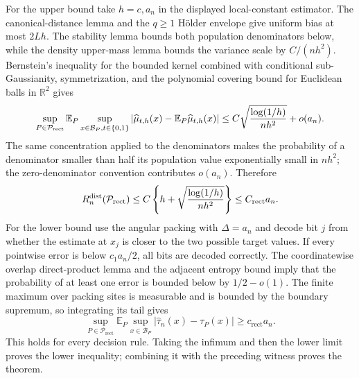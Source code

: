 For the upper bound take \(h=c,a_n\) in the displayed local-constant estimator.  The canonical-distance lemma and the \(q\geq1\) H\"older envelope give uniform bias at most \(2Lh\).  The stability lemma bounds both population denominators below, while the density upper-mass lemma bounds the variance scale by \(C/(nh^2)\).  Bernstein's inequality for the bounded kernel combined with conditional sub-Gaussianity, symmetrization, and the polynomial covering bound for Euclidean balls in \(\mathbb R^2\) gives
\[
 \sup_{P\in\mathcal P_{\mathrm{rect}}}
 \mathbb E_P\sup_{x\in\mathcal B_P,t\in\{0,1\}}
 |\widehat\mu_{t,h}(x)-\mathbb E_P\widehat\mu_{t,h}(x)|
 \leq C\sqrt{\log(1/h)\over nh^2}+o(a_n).
\]
The same concentration applied to the denominators makes the probability of a denominator smaller than half its population value exponentially small in \(nh^2\); the zero-denominator convention contributes \(o(a_n)\).  Therefore
\[
 R_n^{\mathrm{dist}}(\mathcal P_{\mathrm{rect}})
 \leq C\left\{h+\sqrt{\log(1/h)\over nh^2}\right\}\leq C_{\mathrm{rect}}a_n.
\]
For the lower bound use the angular packing with \(\Delta=a_n\) and decode bit \(j\) from whether the estimate at \(x_j\) is closer to the two possible target values.  If every pointwise error is below \(c_1a_n/2\), all bits are decoded correctly.  The coordinatewise overlap direct-product lemma and the adjacent entropy bound imply that the probability of at least one error is bounded below by \(1/2-o(1)\).  The finite maximum over packing sites is measurable and is bounded by the boundary supremum, so integrating its tail gives
\[
 \sup_{P\in\mathcal P_{\mathrm{rect}}}\mathbb E_P\sup_{x\in\mathcal B_P}|\widehat\tau_n(x)-\tau_P(x)|
 \geq c_{\mathrm{rect}}a_n.
\]
This holds for every decision rule.  Taking the infimum and then the lower limit proves the lower inequality; combining it with the preceding witness proves the theorem.